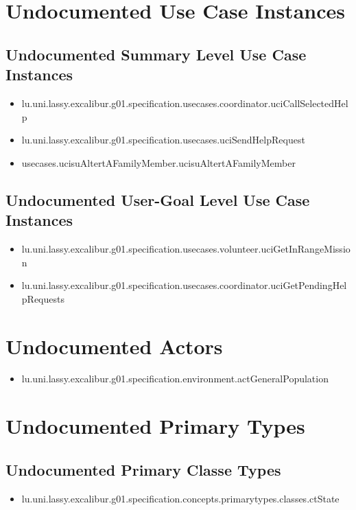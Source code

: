 \section[Undocumented Use Case Instances]{Undocumented Use Case Instances}

\subsection[Undocumented Use Case Instances - Summary Level]{Undocumented Summary Level Use Case Instances}
\begin{itemize}
\item lu.uni.lassy.excalibur.g01.specification.usecases.coordinator.uciCallSelectedHelp 
\item lu.uni.lassy.excalibur.g01.specification.usecases.uciSendHelpRequest 
\item usecases.ucisuAltertAFamilyMember.ucisuAltertAFamilyMember 
\end{itemize}

\subsection[Undocumented Use Case Instances - User-Goal Level]{Undocumented User-Goal Level Use Case Instances}
\begin{itemize}
\item lu.uni.lassy.excalibur.g01.specification.usecases.volunteer.uciGetInRangeMission 
\item lu.uni.lassy.excalibur.g01.specification.usecases.coordinator.uciGetPendingHelpRequests 
\end{itemize}




\section[Undocumented Actors]{Undocumented Actors}
\begin{itemize}
\item lu.uni.lassy.excalibur.g01.specification.environment.actGeneralPopulation 
\end{itemize}




\section[Undocumented Primary Types]{Undocumented Primary Types}

\subsection[Undocumented Primary Classe Types]{Undocumented Primary Classe Types}
\begin{itemize}
\item lu.uni.lassy.excalibur.g01.specification.concepts.primarytypes.classes.ctState 
\end{itemize}

